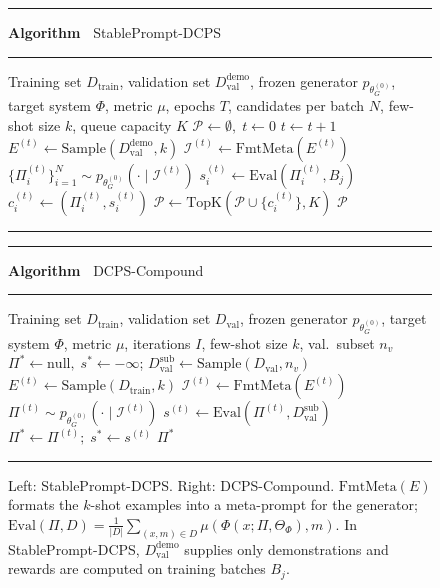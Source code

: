 \documentclass[runningheads]{llncs}
\begin{document}
\begin{figure}[t]
\centering
\begin{minipage}[t]{0.48\textwidth}
\label{alg:no_update}
\hrule\smallskip
{\footnotesize\textbf{Algorithm~\thealgorithm} StablePrompt-DCPS}
\smallskip\hrule\smallskip
{\footnotesize
\begin{algorithmic}[1]
\REQUIRE Training set $D_{\mathrm{train}}$, validation set $D_{\mathrm{val}}^{\mathrm{demo}}$, frozen generator $p_{\theta_G^{(0)}}$, target system $\Phi$, metric $\mu$, epochs $T$, candidates per batch $N$, few-shot size $k$, queue capacity $K$
\STATE $\mathcal{P}\leftarrow\emptyset,\; t\leftarrow 0$
        \STATE $t\leftarrow t+1$
        \STATE $E^{(t)}\leftarrow\mathrm{Sample}(D_{\mathrm{val}}^{\mathrm{demo}},k)$ 
        \STATE $\mathcal{I}^{(t)}\leftarrow \mathrm{FmtMeta}(E^{(t)})$
        \STATE $\{\Pi_i^{(t)}\}_{i=1}^{N}\sim p_{\theta_G^{(0)}}(\cdot\mid\mathcal{I}^{(t)})$ 
            \STATE $s_i^{(t)}\leftarrow\mathrm{Eval}(\Pi_i^{(t)}, B_j)$ 
            \STATE $c_i^{(t)}\leftarrow(\Pi_i^{(t)},s_i^{(t)})$
            \STATE $\mathcal{P}\leftarrow\mathrm{TopK}(\mathcal{P}\cup\{c_i^{(t)}\}, K)$ 
        \ENDFOR
    \ENDFOR
\ENDFOR
\RETURN $\mathcal{P}$
\end{algorithmic}
}
\smallskip\hrule
\end{minipage}%
\hfill
\begin{minipage}[t]{0.48\textwidth}
\label{alg:dcps}
\hrule\smallskip
{\footnotesize\textbf{Algorithm~\thealgorithm} DCPS-Compound}
\smallskip\hrule\smallskip
{\footnotesize
\begin{algorithmic}[1]
\REQUIRE Training set $D_{\mathrm{train}}$, validation set $D_{\mathrm{val}}$, frozen generator $p_{\theta_G^{(0)}}$, target system $\Phi$, metric $\mu$, iterations $I$, few-shot size $k$, val.~subset $n_v$
\STATE $\Pi^*\leftarrow\mathrm{null},\; s^*\leftarrow -\infty$;\; $D_{\mathrm{val}}^{\mathrm{sub}}\leftarrow\mathrm{Sample}(D_{\mathrm{val}},n_v)$
    \STATE $E^{(t)}\leftarrow\mathrm{Sample}(D_{\mathrm{train}},k)$ 
    \STATE $\mathcal{I}^{(t)}\leftarrow \mathrm{FmtMeta}(E^{(t)})$
    \STATE $\Pi^{(t)}\sim p_{\theta_G^{(0)}}(\cdot\mid\mathcal{I}^{(t)})$ 
    \STATE $s^{(t)}\leftarrow\mathrm{Eval}(\Pi^{(t)}, D_{\mathrm{val}}^{\mathrm{sub}})$ 
        \STATE $\Pi^*\leftarrow \Pi^{(t)};\; s^*\leftarrow s^{(t)}$ 
    \ENDIF
\ENDFOR
\RETURN $\Pi^*$
\end{algorithmic}
}
\smallskip\hrule
\end{minipage}
\caption{Left: StablePrompt-DCPS. Right: DCPS-Compound. $\mathrm{FmtMeta}(E)$ formats the $k$-shot examples into a meta-prompt for the generator; $\mathrm{Eval}(\Pi,D)=\frac{1}{|D|}\sum_{(x,m)\in D}\mu(\Phi(x;\Pi,\Theta_\Phi),m)$. In StablePrompt-DCPS, $D_{\mathrm{val}}^{\mathrm{demo}}$ supplies only demonstrations and rewards are computed on training batches $B_j$.}
\end{figure}
\end{document}
